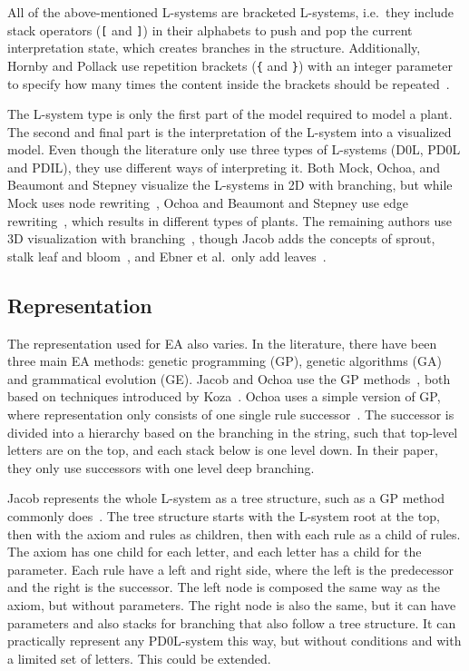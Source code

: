 All of the above-mentioned L-systems are bracketed L-systems, i.e.\ they include stack operators (\texttt{[} and \texttt{]}) in their alphabets to push and pop the current interpretation state, which creates branches in the structure.
Additionally, Hornby and Pollack use repetition brackets (\texttt{\{} and \texttt{\}}) with an integer parameter to specify how many times the content inside the brackets should be repeated~\cite{2001Hornby}.

The L-system type is only the first part of the model required to model a plant.
The second and final part is the interpretation of the L-system into a visualized model.
Even though the literature only use three types of L-systems (D0L, PD0L and PDIL), they use different ways of interpreting it.
Both Mock, Ochoa, and Beaumont and Stepney visualize the L-systems in 2D with branching, but while Mock uses node rewriting~\cite{1998Mock}, Ochoa and Beaumont and Stepney use edge rewriting~\cite{1998Ochoa,2009Beaumont}, which results in different types of plants.
The remaining authors use 3D visualization with branching~\cite{1994Jacob,2006Ashlock}, though Jacob adds the concepts of sprout, stalk leaf and bloom~\cite{1995Jacob}, and Ebner et al.\ only add leaves~\cite{2002Ebner,2003Ebner}.

\subsection{Representation}
The representation used for EA also varies.
In the literature, there have been three main EA methods: genetic programming (GP), genetic algorithms (GA) and grammatical evolution (GE).
Jacob and Ochoa use the GP methods~\cite{1994Jacob,1995Jacob,1998Ochoa}, both based on techniques introduced by Koza~\cite{1992Koza}.
Ochoa uses a simple version of GP, where representation only consists of one single rule successor~\cite{1998Ochoa}.
The successor is divided into a hierarchy based on the branching in the string, such that top-level letters are on the top, and each stack below is one level down.
In their paper, they only use successors with one level deep branching.

Jacob represents the whole L-system as a tree structure, such as a GP method commonly does~\cite{1994Jacob}.
The tree structure starts with the L-system root at the top, then with the axiom and rules as children, then with each rule as a child of rules.
The axiom has one child for each letter, and each letter has a child for the parameter.
Each rule have a left and right side, where the left is the predecessor and the right is the successor.
The left node is composed the same way as the axiom, but without parameters.
The right node is also the same, but it can have parameters and also stacks for branching that also follow a tree structure.
It can practically represent any PD0L-system this way, but without conditions and with a limited set of letters.
This could be extended.

